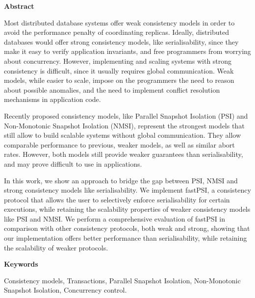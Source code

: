 \newpage

\begin{center}
{\bf \Huge Abstract}
\end{center}

\vspace{1cm}

Most distributed database systems offer weak consistency models in order to avoid
the performance penalty of coordinating replicas. Ideally, distributed databases
would offer strong consistency models, like serialisability, since they make it
easy to verify application invariants, and free programmers from worrying about
concurrency. However, implementing and scaling systems with strong consistency
is difficult, since it usually requires global communication. Weak models, while
easier to scale, impose on the programmers the need to reason about possible
anomalies, and the need to implement conflict resolution mechanisms in application
code.

Recently proposed consistency models, like Parallel Snapshot Isolation (PSI) and
Non-Monotonic Snapshot Isolation (NMSI), represent the strongest models that still
allow to build scalable systems without global communication. They allow comparable
performance to previous, weaker models, as well as similar abort rates. However, both
models still provide weaker guarantees than serialisability, and may prove difficult
to use in applications.

In this work, we show an approach to bridge the gap between PSI, NMSI and strong
consistency models like serialisability. We implement fastPSI, a consistency protocol
that allows the user to selectively enforce serialisability for certain executions,
while retaining the scalability properties of weaker consistency models like PSI and
NMSI. We perform a comprehensive evaluation of fastPSI in comparison with other
consistency protocols, both weak and strong, showing that our implementation
offers better performance than serialisability, while retaining the scalability
of weaker protocols.

\vspace{1cm}

\begin{center}
{\bf \Large Keywords}
\end{center}

\vspace{0.5cm}

Consistency models, Transactions, Parallel Snapshot Isolation, Non-Monotonic
Snapshot Isolation, Concurrency control.
